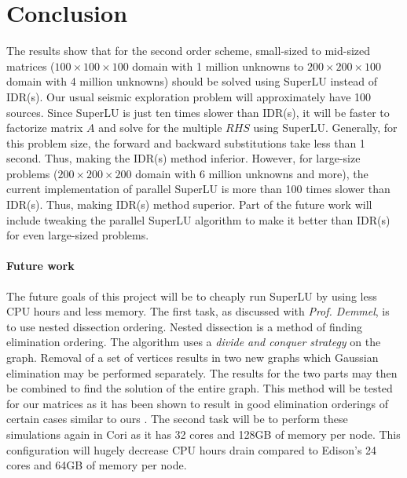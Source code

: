 \documentclass[12pt]{article}
\begin{document}
\section{Conclusion}
The results show that for the second order scheme, small-sized to mid-sized matrices ($100 \times 100 \times 100$ domain with 1 million unknowns to $200 \times 200 \times 100$ domain with 4 million unknowns) should be solved using SuperLU instead of IDR(s). Our usual seismic exploration problem will approximately have 100 sources. Since SuperLU is just ten times slower than IDR(s), it will be faster to factorize matrix $A$ and solve for the multiple $RHS$ using SuperLU. Generally, for this problem size, the forward and backward substitutions take less than 1 second. Thus, making the IDR(s) method inferior. However, for large-size problems ($200 \times 200 \times 200$ domain with 6 million unknowns and more), the current implementation of parallel SuperLU is more than 100 times slower than IDR(s). Thus, making IDR(s) method superior. Part of the future work will include tweaking the parallel SuperLU algorithm to make it better than IDR(s) for even large-sized problems.

\paragraph{Future work} The future goals of this project will be to cheaply run SuperLU by using less CPU hours and less
memory. The first task, as discussed with \emph{Prof. Demmel}, is to use nested dissection ordering. Nested dissection is a method of finding elimination ordering. The algorithm uses a \emph{divide and conquer strategy} on the graph. Removal of a set of vertices results in two new graphs which Gaussian elimination may be performed separately. The results for the two parts may then be combined to find the solution of the entire graph. This method will be tested for our matrices as it has been shown to result in good elimination orderings of certain cases similar to ours \citep{khaira1992nested}. The second task will be to perform these simulations again in Cori as it has 32 cores and 128GB of memory per node. This configuration will hugely decrease CPU hours drain compared to Edison's 24 cores and 64GB of memory per node.
\end{document}
